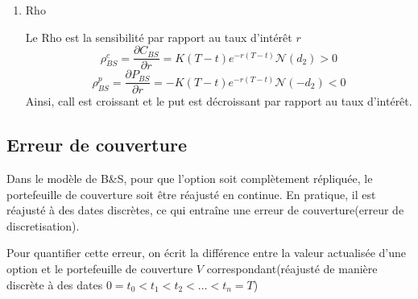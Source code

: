 \documentclass{article}
\theoremstyle{plain}
\theoremstyle{definition}
\begin{document}
\begin{enumerate}
\item Rho

Le Rho est la sensibilit\'e par rapport au taux d'int\'er\^et $r$
\begin{equation}
\rho_{BS}^c=\frac{\partial C_{BS}}{\partial r}=K(T-t)e^{-r(T-t)}\mathcal{N}(d_2)>0
\end{equation}
\begin{equation}
\rho_{BS}^p=\frac{\partial P_{BS}}{\partial r}=-K(T-t)e^{-r(T-t)}\mathcal{N}(-d_2)<0
\end{equation}
Ainsi, call est croissant et le put est d\'ecroissant par rapport au taux d'int\'er\^et.

\end{enumerate}

\subsection{Erreur de couverture}

Dans le mod\`ele de B\&S, pour que l'option soit compl\`etement r\'epliqu\'ee, le portefeuille de couverture soit \^etre r\'eajust\'e en continue. En pratique, il est r\'eajust\'e \`a des dates discr\`etes, ce qui entra\^ine une erreur de couverture(erreur de discretisation).

Pour quantifier cette erreur, on \'ecrit la diff\'erence entre la valeur actualis\'ee d'une option et le portefeuille de couverture $V$ correspondant(r\'eajust\'e de mani\`ere discr\`ete \`a des dates $0=t_0<t_1<t_2<\ldots<t_n=T$)
\end{document}
